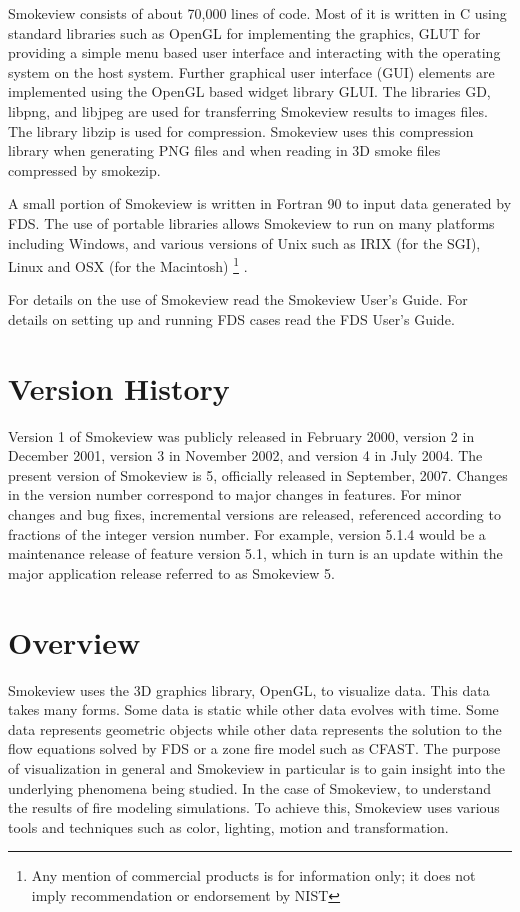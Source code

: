 \documentclass[11pt,twoside]{book}
\begin{document}
Smokeview consists of about 70,000 lines of code.  Most of it is
written in C using standard libraries such as
OpenGL\cite{OpenGLRed} for implementing the graphics, GLUT\cite{OpenGLGlut} for providing a
simple menu based user interface and interacting with the operating system on the host system.
Further graphical user interface (GUI) elements are implemented using the
OpenGL based widget library GLUI\cite{GLUILIB}.
The libraries GD\cite{GDLIB}, libpng\cite{PNGLIB},
and libjpeg\cite{JPEGLIB} are used for transferring Smokeview results to images files.  The library
libzip\cite{ZLIB} is used for compression.  Smokeview uses this compression library when generating PNG files and when reading in 3D smoke files compressed by smokezip.

A small portion of Smokeview is written in Fortran 90 to input data
generated by FDS.  The use of portable libraries allows Smokeview
to run on many platforms including Windows, and various versions
of Unix such as IRIX (for the SGI), Linux and OSX (for the
Macintosh)
\footnote{
Any mention of commercial products is for information only;  it does not imply recommendation or endorsement by NIST}
.

For details on the use of Smokeview read the Smokeview User's
Guide\cite{Smokeview_Users_Guide_5}. For details on setting up and
running FDS cases read the FDS User's
Guide\cite{FDS_Users_Guide_5}.

\section{Version History}

Version 1 of Smokeview was publicly released in February 2000, version 2
in December 2001, version 3 in November 2002, and version 4 in July 2004.
The present version of Smokeview is 5, officially released in September, 2007. Changes in
the version number correspond to major changes in features. For minor changes and bug fixes, incremental
versions are released, referenced according to fractions of the integer
version number. For example, version 5.1.4 would be a maintenance release of feature
version 5.1, which in turn is an update within the major application release referred to as Smokeview 5.

\section{Overview}
Smokeview uses the 3D graphics library, OpenGL, to visualize data.
This data takes many forms.  Some data is static while other data evolves with time.
Some data represents geometric objects while other data represents the solution to the flow equations solved by FDS or a zone fire model such as CFAST.
The purpose of visualization in general and Smokeview in particular is to gain insight into the underlying phenomena being studied.  In the case of Smokeview, to
understand the results of fire modeling simulations.  To achieve this, Smokeview
uses various tools and techniques such as color, lighting, motion and transformation.
\end{document}
